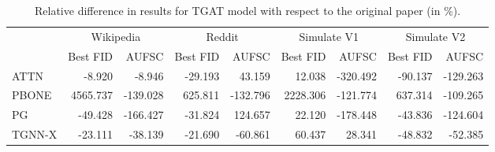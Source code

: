 \begin{table}
\centering
\begin{tabular}{lrrrrrrrr}
\toprule
 & \multicolumn{2}{c}{Wikipedia} & \multicolumn{2}{c}{Reddit} & \multicolumn{2}{c}{Simulate V1} & \multicolumn{2}{c}{Simulate V2} \\
 & Best FID & AUFSC & Best FID & AUFSC & Best FID & AUFSC & Best FID & AUFSC \\
\midrule
ATTN & -8.920 & -8.946 & -29.193 & 43.159 & 12.038 & -320.492 & -90.137 & -129.263 \\
PBONE & 4565.737 & -139.028 & 625.811 & -132.796 & 2228.306 & -121.774 & 637.314 & -109.265 \\
PG & -49.428 & -166.427 & -31.824 & 124.657 & 22.120 & -178.448 & -43.836 & -124.604 \\
TGNN-X & -23.111 & -38.139 & -21.690 & -60.861 & 60.437 & 28.341 & -48.832 & -52.385 \\
\bottomrule
\end{tabular}
\caption{\label{tab:tgat_results_diff}Relative difference in results for TGAT model with respect to the original paper (in \%).}
\end{table}
